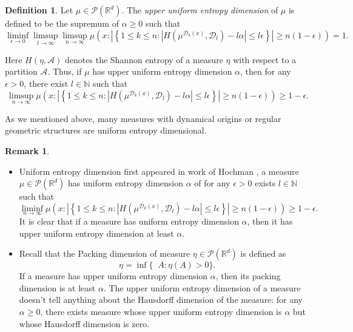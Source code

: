 \documentclass[a4paper,11pt]{amsart}
\theoremstyle{definition}
\newtheorem{definition}[theorem]{Definition}
\newtheorem{remark}[theorem]{Remark}
\numberwithin{equation}{section}
\def\to{\rightarrow}
\def\D{\mathcal{D}}
\def\cP{\mathcal P}
\def\N{\mathbb N}
\def\R{\mathbb R}
\DeclareMathOperator{\dimP}{dim_P}
\begin{document}
\begin{definition}\label{def:upper-unif-entrop-dim:1}
Let $\mu\in \cP(\R^d)$. The {\em upper uniform entropy dimension} of $\mu$ is defined to be the supremum of $\alpha\ge 0$ such that 
\begin{equation}\label{eq:def:upper-unif-entrop-dim:1}
\liminf_{\epsilon\to0}\limsup_{l\to\infty}\limsup_{n\to\infty}\mu\left( x:\left| \left\{ 1\le k\le n: \left|H(\mu^{\D_k(x)},\D_l)-l\alpha\right| \le l \epsilon \right\} \right| \ge n(1-\epsilon) \right) =1.
\end{equation} 
\end{definition}
Here $H(\eta,\mathcal{A})$ denotes the Shannon entropy of a measure $\eta$ with respect to a partition $\mathcal{A}$.
Thus,  if $\mu$ has  upper uniform entropy dimension $\alpha$, then for any $\epsilon>0$,  there exist $l\in \N$ such that 
\begin{equation}\label{eq:def:upper-unif-entrop-dim:2}
\limsup_{n\to\infty}\mu\left( x:\left| \left\{ 1\le k\le n: \left|H(\mu^{\D_k(x)},\D_l)-l\alpha\right| \le l \epsilon \right\} \right| \ge n(1-\epsilon) \right) \ge 1-\epsilon.
\end{equation}

As we mentioned above, many measures with dynamical origins or regular geometric structures are uniform entropy dimensional. 
\begin{remark}\label{remark:1}
\begin{itemize}
\item[(1)]  Uniform entropy dimension first appeared in work of Hochman \cite{Hochman2014}, a measure $\mu\in \cP(\R^d)$ has uniform entropy dimension $\alpha$ of for any $\epsilon>0$ exists $l\in \N$ such that 
\[
\liminf_{n\to\infty}\mu\left( x: \left| \left\{ 1\le k\le n: \left|H(\mu^{\D_k(x)},\D_l)-l\alpha\right| \le l \epsilon \right\} \right| \ge n(1-\epsilon) \right) \ge 1-\epsilon.
\]
It is clear that if a measure has uniform entropy dimension $\alpha$, then it has upper uniform entropy dimension at least $\alpha.$
\item[(2)] Recall that the Packing dimension of measure $\eta\in \cP(\R^d)$ is defined as
\[
\dimP \eta=\inf\{ \dimP A: \eta(A)>0 \}.
\]
 If a measure has upper uniform entropy dimension $\alpha$,   then its packing dimension is at least $\alpha$.  The  upper uniform entropy dimension of a measure doesn't tell anything about  the Hausdorff dimension of the measure: for any $\alpha\ge 0$,  there exists measure whose upper uniform entropy dimension is $\alpha$ but whose Hausdorff dimension is zero.
\end{itemize}
\end{remark}
\end{document}
